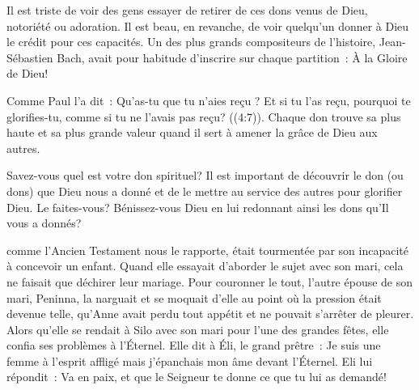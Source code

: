 
Il est triste de voir des gens essayer de retirer de ces dons venus de Dieu,
 notoriété ou adoration. Il est beau, en revanche, de voir quelqu'un donner
 à Dieu le crédit pour ces capacités.
 Un des plus grands compositeurs de l'histoire, Jean-Sébastien Bach,
 avait pour habitude d'inscrire sur chaque partition~: 
 \og À la Gloire de Dieu! \fg{}

Comme Paul l'a dit~: 
 \og Qu'as-tu que tu n'aies reçu ? Et si tu l'as reçu,
 pourquoi te glorifies-tu, comme si tu ne l'avais pas reçu?
 ((4:7)).
 Chaque don trouve sa plus haute et sa plus grande valeur
 quand il sert à amener la grâce de Dieu aux autres.

Savez-vous quel est votre don spirituel? Il est important de découvrir le don
 (ou dons) que Dieu nous a donné et de le mettre au service des autres
 pour glorifier Dieu. Le faites-vous? Bénissez-vous Dieu en lui redonnant
 ainsi les dons qu'Il vous a donnés?

\dvrule






 comme l'Ancien Testament nous le rapporte,
 était tourmentée par son incapacité à concevoir un enfant.
 Quand elle essayait d'aborder le sujet avec son mari,
 cela ne faisait que déchirer leur mariage. Pour couronner le tout,
 l'autre épouse de son mari, Peninna, la narguait et se moquait d'elle
 au point où la pression était devenue telle, qu'Anne avait perdu
 tout appétit et ne pouvait s'arrêter de pleurer.
 Alors qu'elle se rendait à Silo avec son mari pour l'une des grandes fêtes,
 elle confia ses problèmes à l'Éternel.
 Elle dit à Éli, le grand prêtre~: 
 \og Je suis une femme à l'esprit affligé mais j'épanchais mon âme
 devant l'Éternel. \fg{}
 Eli lui répondit~: 
 \og Va en paix, et que le Seigneur te donne ce que tu lui as demandé! \fg{}


